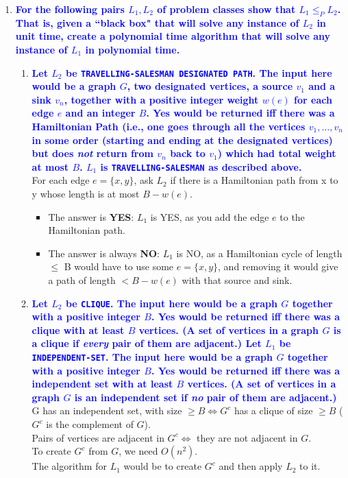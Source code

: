 \documentclass[11pt]{article}
\begin{document}
\begin{enumerate}
\item \textbf{\textcolor{blue}{For the following pairs $L_1,L_2$ of problem classes show that $L_1\leq_P L_2$.  That is, given a ``black box" that will solve any instance of $L_2$ in unit time, create a polynomial time algorithm that will solve any instance of $L_1$ in polynomial time.}}
\begin{enumerate}
    \item \textbf{\textcolor{blue}{Let $L_2$ be {\tt TRAVELLING-SALESMAN DESIGNATED PATH}. The input here would be a graph $G$, two designated vertices, a source $v_1$ and a sink $v_n$, together with a positive integer weight $w(e)$ for each edge $e$ and an integer $B$.  Yes would be returned iff there was a Hamiltonian Path (i.e., one goes through all the vertices $v_1,\ldots,v_n$ in some order (starting and ending at the designated vertices) but does {\em not} return from $v_n$ back to $v_1$) which had total weight at most $B$. $L_1$ is {\tt TRAVELLING-SALESMAN} as described above.}}
        \\ For each edge $e = \{x, y\}$, ask $L_2$ if there is a Hamiltonian path from x to y whose length is at most $B - w(e)$.
        \begin{itemize}
            \item The answer is \textbf{YES}: $L_1$ is YES, as you add the edge $e$ to the Hamiltonian path.
            \item The answer is always \textbf{NO}: $L_1$ is NO, as a Hamiltonian cycle of length $\leq$ B would have to use some $e = \{x,y\}$, and removing it would give a path of length $< B - w(e)$ with that source and sink.
        \end{itemize}
        
    \item \textbf{\textcolor{blue}{Let $L_2$ be {\tt CLIQUE}. The input here would be a graph $G$ together with a positive integer $B$. Yes would be returned iff there was a clique with at least $B$ vertices. (A set of vertices in a graph $G$ is a clique if {\em every} pair of them are adjacent.) Let $L_1$ be {\tt INDEPENDENT-SET}. The input here would be a graph $G$ together with a positive integer $B$. Yes would be returned iff there was a independent set with at least $B$ vertices. (A set of vertices in a graph $G$ is an independent set if {\em no} pair of them are adjacent.)}}
        \\ G has an independent set, with size $\geq B \Leftrightarrow G^c$ has a clique of size $\geq B$ ($G^c$ is the complement of $G$).
        \\ Pairs of vertices are adjacent in $G^c \Leftrightarrow$ they are not adjacent in $G$.
        \\ To create $G^c$ from $G$, we need $O(n^2)$.
        \\ The algorithm for $L_1$ would be to create $G^c$ and then apply $L_2$ to it.
\end{enumerate}


\end{enumerate}
\end{document}
